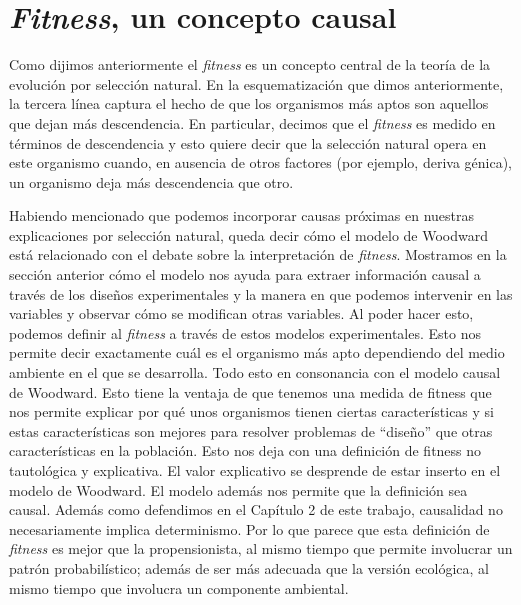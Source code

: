 \section{\emph{Fitness}, un concepto causal}

\noindent Como dijimos anteriormente el \emph{fitness} es un concepto central de la teoría de la evolución por selección natural. En la esquematización que dimos anteriormente, la tercera línea captura el hecho de que los organismos más aptos son aquellos que dejan más descendencia. En particular, decimos que el \emph{fitness} es medido en términos de descendencia y esto quiere decir que la selección natural opera en este organismo cuando, en ausencia de otros factores (por ejemplo, deriva génica), un organismo deja más descendencia que otro.

Habiendo mencionado que podemos incorporar causas próximas en nuestras explicaciones por selección natural, queda decir cómo el modelo de Woodward está relacionado con el debate sobre la interpretación de \emph{fitness}. Mostramos en la sección anterior cómo el modelo nos ayuda para extraer información causal a través de los diseños experimentales y la manera en que podemos intervenir en las variables y observar cómo se modifican otras variables. Al poder hacer esto, podemos definir al \emph{fitness} a través de estos modelos experimentales. Esto nos permite decir exactamente cuál es el organismo más apto dependiendo del medio ambiente en el que se desarrolla. Todo esto en consonancia con el modelo causal de Woodward. Esto tiene la ventaja de que tenemos una medida de fitness que nos permite explicar por qué unos organismos tienen ciertas características y si estas características son mejores para resolver problemas de ``diseño'' que otras características en la población. Esto nos deja con una definición de fitness no tautológica y explicativa. El valor explicativo se desprende de estar inserto en el modelo de Woodward. El modelo además nos permite que la definición sea causal. Además como defendimos en el Capítulo 2 de este trabajo, causalidad no necesariamente implica determinismo. Por lo que parece que esta definición de \emph{fitness} es mejor que la propensionista, al mismo tiempo que permite involucrar un patrón probabilístico; además de ser más adecuada que la versión ecológica, al mismo tiempo que involucra un componente ambiental.

